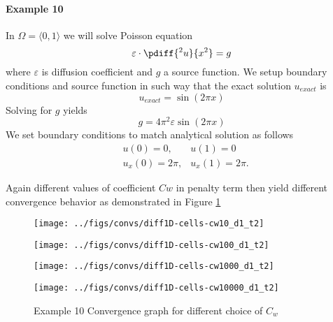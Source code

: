 \newpage
\paragraph{Example 10}
In $\Omega = \langle 0, 1 \rangle$ we will solve Poisson equation
\begin{equation}
\varepsilon \cdot \pdiff{^2 u}{x^2} = g
\end{equation}
where  $\varepsilon$ is diffusion coefficient and $g$ a source function. We setup boundary conditions and source 
function in such way that the exact solution $u_{exact}$ is
\begin{equation}
u_{exact} = \sin(2\pi x)
\end{equation}
Solving for $g$ yields
\begin{equation}
	g = 4\pi^2\varepsilon\sin(2\pi x)
\end{equation}
We set boundary conditions to match analytical solution as follows
\begin{equation}
	\begin{aligned}
		&u(0) = 0,      &u(1) = 0\\
		&u_x(0) = 2\pi, &u_x(1) = 2\pi.
	\end{aligned}
\end{equation}

Again different values of coefficient $Cw$ in penalty term then yield different convergence behavior as demonstrated in 
Figure \ref{fig:conv_diff1D}

\begin{figure}[h]
	\begin{minipage}[b]{0.5\linewidth}
		\texttt{[image: ../figs/convs/diff1D-cells-cw10\_d1\_t2]}
	\end{minipage}
	\begin{minipage}[b]{0.5\linewidth}
		\texttt{[image: ../figs/convs/diff1D-cells-cw100\_d1\_t2]}
	\end{minipage}

	\begin{minipage}[b]{0.5\linewidth}
		\texttt{[image: ../figs/convs/diff1D-cells-cw1000\_d1\_t2]}
	\end{minipage}
	\begin{minipage}[b]{0.5\linewidth}
		\texttt{[image: ../figs/convs/diff1D-cells-cw10000\_d1\_t2]}
	\end{minipage}
	
	\caption{Example 10 Convergence graph for different choice of $C_w$}
	\label{fig:conv_diff1D}
\end{figure}


